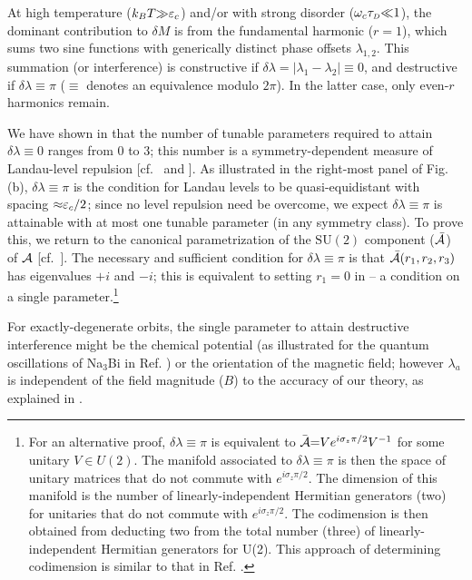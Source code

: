 \documentclass[aps, showpacs, twocolumn, notitlepage, superscriptaddress]{revtex4-1}
\begin{document}
At high temperature ($k_BT{\gg}\varepsilon_c$) and/or with strong disorder ($\omega_c\tau_{\scriptscriptstyle{D}}{\ll}1$), the dominant contribution to $\delta M$ is from the fundamental harmonic ($r{=}1$), which sums two sine functions with generically distinct phase offsets $\lambda_{1,2}$. This summation (or interference) is constructive if $\delta \lambda{=}|\lambda_1{-}\lambda_2|{\equiv}0$, and destructive if $\delta \lambda{\equiv}\pi$  ($\equiv$ denotes an equivalence modulo $2\pi$). In the latter case, only even-$r$ harmonics remain.

We have shown in  that  the number of tunable parameters required to attain  $\delta \lambda{\equiv}0$ ranges from $0$ to $3$; this number is a symmetry-dependent measure of Landau-level repulsion [cf.\  and ]. As illustrated in the right-most panel of Fig. (b), $\delta \lambda{\equiv}\pi$ is the condition  for Landau levels to be quasi-equidistant  with spacing ${\approx}\varepsilon_c/2$; since no level repulsion need be overcome,
we expect $\delta \lambda{\equiv}\pi$ is attainable with at most one tunable parameter (in any symmetry class). To prove this, we return to the canonical parametrization of the $\text{SU}(2)$ component (${\cal \bar{A}}$) of ${\cal A}$ [cf.\ ]. The necessary and sufficient condition for $\delta \lambda{\equiv}\pi$ is that ${\cal \bar{A}}(r_1,r_2,r_3)$ has eigenvalues $+i$ and $-i$; this is equivalent to setting $r_1{=}0$ in  -- a condition on a single parameter.\footnote{For an alternative proof,  $\delta \lambda{\equiv}\pi$ is equivalent to ${ \bar{\cal A}}{=}Ve^{i\sigma_z\pi/2}V^{-1}$ for some unitary $V\in U(2)$. The manifold associated to $\delta \lambda{\equiv}\pi$ is then the space of unitary matrices  that do not commute with $e^{i\sigma_z\pi/2}$. The dimension of this manifold is the number of linearly-independent Hermitian generators (two) for unitaries that do not commute with $e^{i\sigma_z\pi/2}$. The codimension is then obtained from deducting two from the total number (three)  of linearly-independent Hermitian generators  for U(2). This approach of determining codimension is similar to that in Ref. .} 

For exactly-degenerate orbits, the single parameter to attain destructive interference might be the chemical potential (as illustrated for the quantum oscillations of Na$_3$Bi in Ref. ) or the orientation of the magnetic field; however $\lambda_a$ is independent of the field magnitude ($B$) to the accuracy\cite{rothmag,fuchs_landau_2018,gao_zero-field_2017,fischbeck_review} of our theory, as explained in . 
\end{document}
